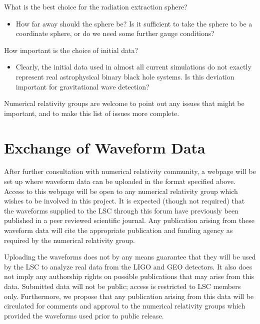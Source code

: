 \documentclass[10pt]{ligodcc}
\begin{document}
What is the best choice for the radiation extraction sphere?
\begin{itemize}
\item How far away should the sphere be?  Is it sufficient to take the
  sphere to be a coordinate sphere, or do we need some further gauge
  conditions?
\end{itemize}
How important is the choice of initial data?
\begin{itemize}
\item Clearly, the initial data used in almost all current simulations
  do not exactly represent real astrophysical binary black hole
  systems.  Is this deviation important for gravitational wave
  detection?
\end{itemize}
Numerical relativity groups are welcome to point out any issues that
might be important, and to make this list of issues more complete.  


\section{Exchange of Waveform Data}
\label{sec:authorship}

After further consultation with numerical relativity community, a
webpage will be set up where waveform data can be uploaded in the
format specified above.  Access to this webpage will be open to any
numerical relativity group which wishes to be involved in this
project.  It is expected (though not required) that the waveforms
supplied to the LSC through this forum have previously been published
in a peer reviewed scientific journal.  Any publication arising from
these waveform data will cite the appropriate publication and funding
agency as required by the numerical relativity group.

Uploading the waveforms does not by any means guarantee that they will
be used by the LSC to analyze real data from the LIGO and GEO
detectors.  It also does not imply any authorship rights on possible
publications that may arise from this data.  Submitted data will not
be public; access is restricted to LSC members only.  Furthermore, we
propose that any publication arising from this data will be circulated
for comments and approval to the numerical relativity groups which
provided the waveforms used prior to public release.
\end{document}
